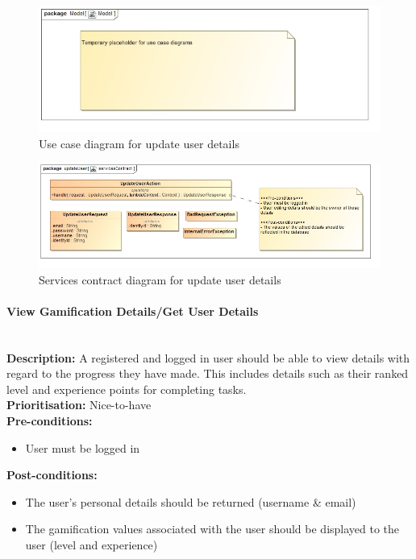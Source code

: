 \documentclass{article}
\begin{document}
		\begin{figure}[H]
			\includegraphics[width=\linewidth]{images/tempUseCase.jpg}
			\caption{Use case diagram for update user details}
		\end{figure}		
		
		\begin{figure}[H]
			\includegraphics[width=\linewidth]{images/ServicesContracts/updateUser.jpg}
			\caption{Services contract diagram for update user details}
		\end{figure}
	
	\paragraph{View Gamification Details/Get User Details}\mbox{}\\
		\textbf{Description:} A registered and logged in user should be able to view details with regard to the progress they have made. This includes details such as their ranked level and experience points for completing tasks.\\
		\textbf{Prioritisation:} Nice-to-have\\		
		\textbf{Pre-conditions:}
			\begin{itemize}
				\item User must be logged in
			\end{itemize}
		\textbf{Post-conditions:}
			\begin{itemize}
				\item The user's personal details should be returned (username \& email)
				\item The gamification values associated with the user should be displayed to the user (level and experience)
			\end{itemize}
\end{document}
